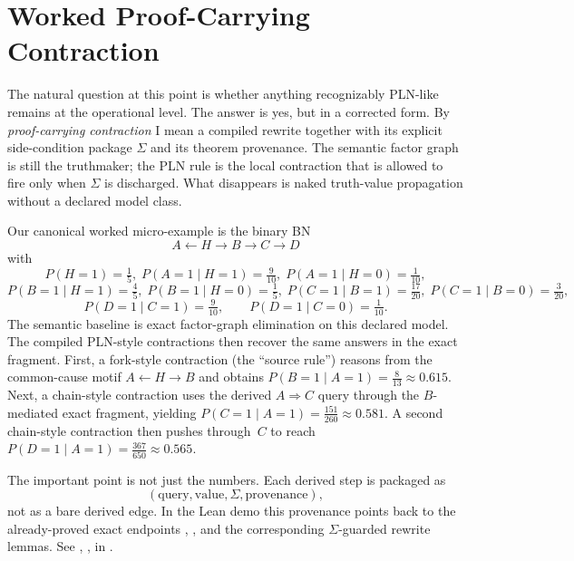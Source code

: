\documentclass[11pt,openany]{report}
\begin{document}
\section{Worked Proof-Carrying Contraction}

The natural question at this point is whether anything recognizably
PLN-like remains at the operational level.  The answer is yes, but in a
corrected form.  By \emph{proof-carrying contraction} I mean a compiled
rewrite together with its explicit side-condition package $\Sigma$ and
its theorem provenance.  The semantic factor graph is still the
truthmaker; the PLN rule is the local contraction that is allowed to fire
only when $\Sigma$ is discharged.  What disappears is naked truth-value
propagation without a declared model class.

Our canonical worked micro-example is the binary BN
\[
  A \leftarrow H \to B \to C \to D
\]
with
\[
  P(H{=}1)=\tfrac15,\;
  P(A{=}1 \mid H{=}1)=\tfrac9{10},\;
  P(A{=}1 \mid H{=}0)=\tfrac1{10},
\]
\[
  P(B{=}1 \mid H{=}1)=\tfrac45,\;
  P(B{=}1 \mid H{=}0)=\tfrac15,\;
  P(C{=}1 \mid B{=}1)=\tfrac{17}{20},\;
  P(C{=}1 \mid B{=}0)=\tfrac3{20},
\]
\[
  P(D{=}1 \mid C{=}1)=\tfrac9{10},\qquad
  P(D{=}1 \mid C{=}0)=\tfrac1{10}.
\]
The semantic baseline is exact factor-graph elimination on this declared
model.  The compiled PLN-style contractions then recover the same answers
in the exact fragment.  First, a fork-style contraction (the ``source
rule'') reasons from the common-cause motif $A \leftarrow H \to B$ and
obtains $P(B{=}1 \mid A{=}1)=\tfrac8{13}\approx 0.615$.  Next, a
chain-style contraction uses the derived $A \Rightarrow C$ query through
the $B$-mediated exact fragment, yielding
$P(C{=}1 \mid A{=}1)=\tfrac{151}{260}\approx 0.581$.  A second
chain-style contraction then pushes through~$C$ to reach
$P(D{=}1 \mid A{=}1)=\tfrac{367}{650}\approx 0.565$.

The important point is not just the numbers.  Each derived step is
packaged as
\[
  (\text{query}, \text{value}, \Sigma, \text{provenance}),
\]
not as a bare derived edge.  In the Lean demo this provenance points back
to the already-proved exact endpoints
,
, and the corresponding
$\Sigma$-guarded rewrite lemmas.  See
,
,
 in
.
\end{document}
